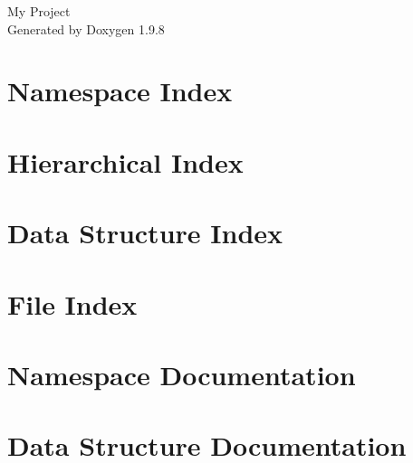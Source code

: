 \documentclass[twoside]{book}
\newcommand{\+}{\discretionary{\mbox{\scriptsize$\hookleftarrow$}}{}{}}
\newcommand{\clearemptydoublepage}{%
    \newpage{\pagestyle{empty}\cleardoublepage}%
  }
\begin{document}
  \raggedbottom
    \hypersetup{pageanchor=false,
                bookmarksnumbered=true,
                pdfencoding=unicode
               }
  \begin{titlepage}
  \vspace*{7cm}
  \begin{center}%
  {\Large My Project}\\
  \vspace*{1cm}
  {\large Generated by Doxygen 1.9.8}\\
  \end{center}
  \end{titlepage}
  \clearemptydoublepage
  \tableofcontents
  \clearemptydoublepage
  \hypersetup{pageanchor=true}
\chapter{Namespace Index}

\chapter{Hierarchical Index}

\chapter{Data Structure Index}

\chapter{File Index}

\chapter{Namespace Documentation}








\chapter{Data Structure Documentation}

















\end{document}
